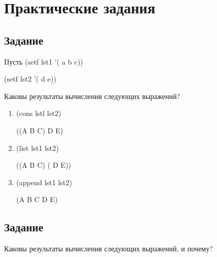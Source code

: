 \section{Практические задания}

\subsection{Задание }

Пусть (setf lst1 '( a b c))

(setf lst2 '( d e))

Каковы результаты вычисления следующих выражений?

\begin{enumerate}[label*=\arabic*.]
	\item (cons lstl lst2) 
	
	((A B C) D E)
	
	\item (list lst1 lst2) 
	
	((A B C) ( D E))
	
	\item (append lst1 lst2)
	
	(A B C D E)
	
\end{enumerate} 


\subsection{Задание }

Каковы результаты вычисления следующих выражений, и почему?

